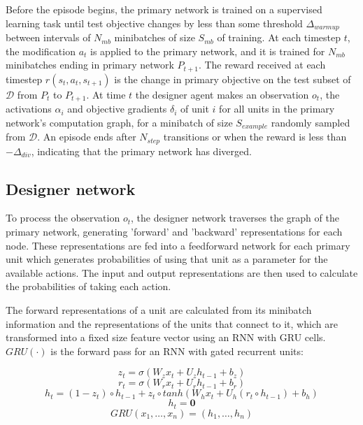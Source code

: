 \documentclass{article}[12px]
\begin{document}
Before the episode begins, the primary network is trained on a supervised learning task until test objective changes by less than some threshold \(\Delta_{warmup}\) between intervals of \(N_{mb}\) minibatches of size \(S_{mb}\) of training. At each timestep \(t\), the modification \(a_t\) is applied to the primary network, and it is trained for \(N_{mb}\) minibatches ending in primary network \(P_{t+1}\). The reward received at each timestep \(r(s_t, a_t, s_{t+1})\) is the change in primary objective on the test subset of \(\mathcal{D}\) from \(P_t\) to \(P_{t+1}\). At time \(t\) the designer agent makes an observation \(o_t\), the activations \(\alpha_i\) and objective gradients \(\delta_i\) of unit \(i\) for all units in the primary network's computation graph, for a minibatch of size \(S_{example}\) randomly sampled from \(\mathcal{D}\). An episode ends after \(N_{step}\) transitions or when the reward is less than \(-\Delta_{div}\), indicating that the primary network has diverged.

\subsection{Designer network}

To process the observation \(o_t\), the designer network traverses the graph of the primary network, generating 'forward' and 'backward' representations for each node. These representations are fed into a feedforward network for each primary unit which generates probabilities of using that unit as a parameter for the available actions. The input and output representations are then used to calculate the probabilities of taking each action.

The forward representations of a unit are calculated from its minibatch information and the representations of the units that connect to it, which are transformed into a fixed size feature vector using an RNN with GRU cells. \(GRU(\cdot)\) is the forward pass for an RNN with gated recurrent units:

\begin{equation}
  z_t = \sigma(W_zx_t + U_zh_{t-1} + b_z)
\end{equation}
\begin{equation}
  r_t = \sigma(W_rx_t + U_rh_{t-1} + b_r)
\end{equation}
\begin{equation}
  h_t = (1-z_t) \circ h_{t-1} + z_t \circ tanh(W_hx_t + U_h(r_t \circ h_{t-1}) + b_h)
\end{equation}
\begin{equation}
  h_t = \mathbf{0}
\end{equation}
\begin{equation}
  GRU(x_1, \ldots, x_n) = (h_1, \ldots, h_n)
\end{equation}
\end{document}

